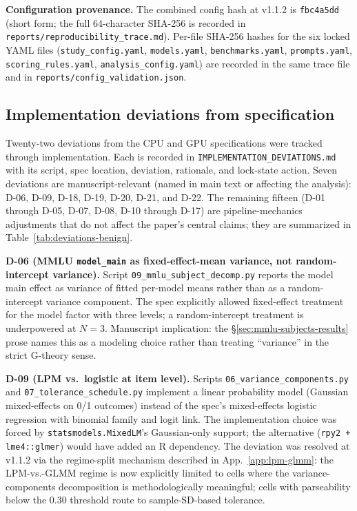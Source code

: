 \documentclass[11pt]{article}
\begin{document}
\textbf{Configuration provenance.} The combined config hash at v1.1.2 is \texttt{fbc4a5dd} (short form; the full 64-character SHA-256 is recorded in \texttt{reports/reproducibility\_trace.md}). Per-file SHA-256 hashes for the six locked YAML files (\texttt{study\_config.yaml}, \texttt{models.yaml}, \texttt{benchmarks.yaml}, \texttt{prompts.yaml}, \texttt{scoring\_rules.yaml}, \texttt{analysis\_config.yaml}) are recorded in the same trace file and in \texttt{reports/config\_validation.json}.

\subsection{Implementation deviations from specification}
\label{app:deviations}

Twenty-two deviations from the CPU and GPU specifications were tracked through implementation. Each is recorded in \texttt{IMPLEMENTATION\_DEVIATIONS.md} with its script, spec location, deviation, rationale, and lock-state action. Seven deviations are manuscript-relevant (named in main text or affecting the analysis): D-06, D-09, D-18, D-19, D-20, D-21, and D-22. The remaining fifteen (D-01 through D-05, D-07, D-08, D-10 through D-17) are pipeline-mechanics adjustments that do not affect the paper's central claims; they are summarized in Table~\ref{tab:deviations-benign}.

\textbf{D-06 (MMLU \texttt{model\_main} as fixed-effect-mean variance, not random-intercept variance).} Script \texttt{09\_mmlu\_subject\_decomp.py} reports the model main effect as variance of fitted per-model means rather than as a random-intercept variance component. The spec explicitly allowed fixed-effect treatment for the model factor with three levels; a random-intercept treatment is underpowered at $N = 3$. Manuscript implication: the §\ref{sec:mmlu-subjects-results} prose names this as a modeling choice rather than treating ``variance'' in the strict G-theory sense.

\textbf{D-09 (LPM vs.\ logistic at item level).} Scripts \texttt{06\_variance\_components.py} and \texttt{07\_tolerance\_schedule.py} implement a linear probability model (Gaussian mixed-effects on 0/1 outcomes) instead of the spec's mixed-effects logistic regression with binomial family and logit link. The implementation choice was forced by \texttt{statsmodels.MixedLM}'s Gaussian-only support; the alternative (\texttt{rpy2 + lme4::glmer}) would have added an R dependency. The deviation was resolved at v1.1.2 via the regime-split mechanism described in App.~\ref{app:lpm-glmm}: the LPM-vs.-GLMM regime is now explicitly limited to cells where the variance-components decomposition is methodologically meaningful; cells with parseability below the 0.30 threshold route to sample-SD-based tolerance.
\end{document}

